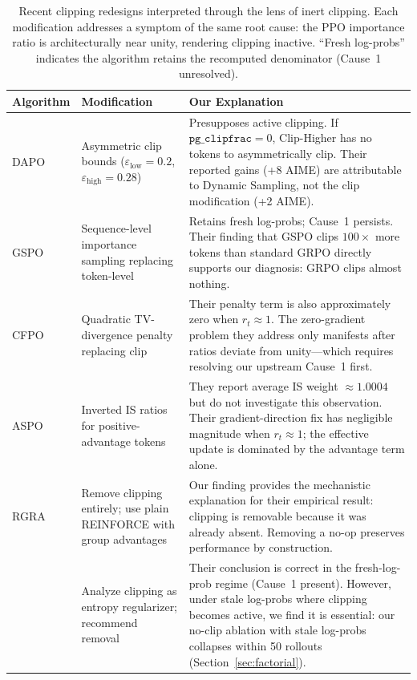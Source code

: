 \begin{table}[t]
\centering
\caption{Recent clipping redesigns interpreted through the lens of inert clipping.
Each modification addresses a symptom of the same root cause: the PPO importance ratio is architecturally near unity, rendering clipping inactive.
``Fresh log-probs'' indicates the algorithm retains the recomputed denominator (Cause~1 unresolved).}
\label{tab:related-redesigns}
\small
\begin{tabular}{@{}p{2.0cm}p{4.5cm}p{7.5cm}@{}}
\toprule
\textbf{Algorithm} & \textbf{Modification} & \textbf{Our Explanation} \\
\midrule
DAPO \newline \citep{dapo2025}
& Asymmetric clip bounds ($\varepsilon_{\text{low}} = 0.2$, $\varepsilon_{\text{high}} = 0.28$)
& Presupposes active clipping.
  If $\texttt{pg\_clipfrac} = 0$, Clip-Higher has no tokens to asymmetrically clip.
  Their reported gains (+8 AIME) are attributable to Dynamic Sampling, not the clip modification (+2 AIME). \\
\addlinespace
GSPO \newline \citep{gspo2025}
& Sequence-level importance sampling replacing token-level
& Retains fresh log-probs; Cause~1 persists.
  Their finding that GSPO clips $100\times$ more tokens than standard GRPO directly supports our diagnosis: GRPO clips almost nothing. \\
\addlinespace
CFPO \newline \citep{cfpo2025}
& Quadratic TV-divergence penalty replacing clip
& Their penalty term is also approximately zero when $r_t \approx 1$.
  The zero-gradient problem they address only manifests after ratios deviate from unity---which requires resolving our upstream Cause~1 first. \\
\addlinespace
ASPO \newline \citep{aspo2025}
& Inverted IS ratios for positive-advantage tokens
& They report average IS weight $\approx 1.0004$ but do not investigate this observation.
  Their gradient-direction fix has negligible magnitude when $r_t \approx 1$; the effective update is dominated by the advantage term alone. \\
\addlinespace
RGRA \newline \citep{rgra2025}
& Remove clipping entirely; use plain REINFORCE with group advantages
& Our finding provides the mechanistic explanation for their empirical result: clipping is removable because it was already absent.
  Removing a no-op preserves performance by construction. \\
\addlinespace
\citet{chen2025iclr}
& Analyze clipping as entropy regularizer; recommend removal
& Their conclusion is correct in the fresh-log-prob regime (Cause~1 present).
  However, under stale log-probs where clipping becomes active, we find it is essential: our no-clip ablation with stale log-probs collapses within 50 rollouts (Section~\ref{sec:factorial}). \\
\bottomrule
\end{tabular}
\end{table}

